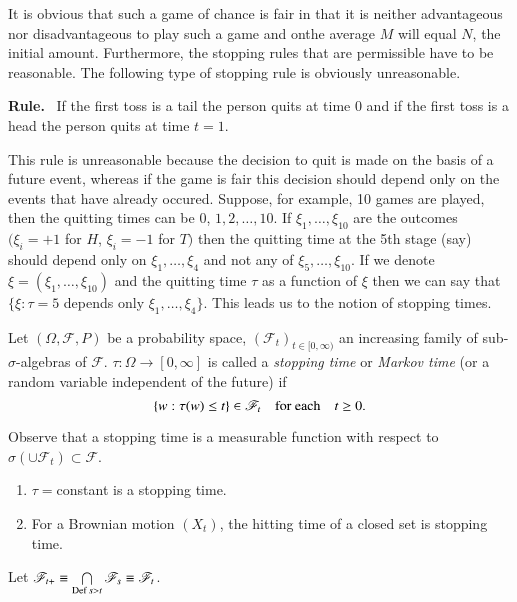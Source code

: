 It is obvious that such a game of chance is fair in that it is neither
advantageous nor disadvantageous to play such a game and
on\pageoriginale the average $M$ will equal $N$, the initial
amount. Furthermore, the stopping rules that are permissible have to
be reasonable. The following type of stopping rule is obviously
unreasonable. 

\medskip
\noindent
{\bf Rule.}~ If the first toss is a tail the person quits at time $0$
and if the first toss is a head the person quits at time $t=1$.


This rule is unreasonable because the decision to quit is made on the
basis of a future event, whereas if the game is fair this decision
should depend only on the events that have already occured. Suppose,
for example, 10 games are played, then the quitting times can be $0$,
$1,2,\ldots,10$. If $\xi_{1},\ldots,\xi_{10}$ are the outcomes
$(\xi_{i}=+1$ for $H$, $\xi_{i}=-1$ for $T)$ then the quitting time at
the 5th stage (say) should depend only on $\xi_{1},\ldots,\xi_{4}$ and
not any of $\xi_{5},\ldots,\xi_{10}$. If we denote
$\xi=(\xi_{1},\ldots,\xi_{10})$ and the quitting time $\tau$ as a
function of $\xi$ then we can say that $\{\xi:\tau=5$ depends only
$\xi_{1},\ldots,\xi_{4}\}$. This leads us to the notion of stopping
times.

\begin{defi*}
Let $(\Omega,\mathscr{F},P)$ be a probability space,
$(\mathscr{F}_{t})_{t\in [0,\infty)}$ an increasing family of
  sub-$\sigma$-algebras of $\mathscr{F}$. $\tau:\Omega\to [0,\infty]$
  is called a {\em stopping time} or {\em Markov time} (or a random
  variable independent of the future) if
$$
\{w:\tau(w)\leq t\}\in \mathscr{F}_{t}\quad\text{for each}\quad t\geq 0.
$$

Observe that a stopping time is a measurable function with respect to
$\sigma(\cup \mathscr{F}_{t})\subset \mathscr{F}$.
\end{defi*}

\begin{examples*}
\begin{enumerate}
\item $\tau=$\pageoriginale constant is a stopping time.

\item For a Brownian motion $(X_{t})$, the hitting time of a closed
  set is stopping time.
\end{enumerate}
\end{examples*}


\begin{exercise}
Let $\mathscr{F}_{t+}\equiv \bigcap\limits_{\operatorname{Def}
  s>t}\mathscr{F}_{s}\equiv \mathscr{F}_{t}$.
\end{exercise}


